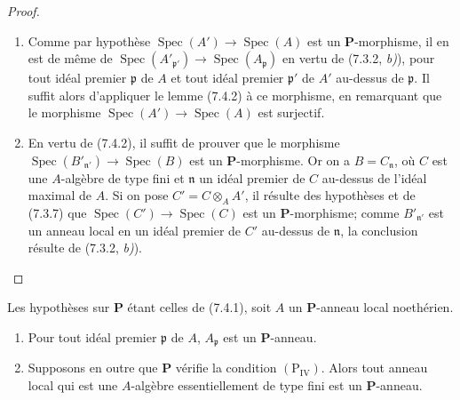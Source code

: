\begin{proof}
\begin{enumerate}
\item[(i)] Comme par hypothèse
$\operatorname{Spec}(A')\to\operatorname{Spec}(A)$ est un
$\boldsymbol P$-morphisme, il en est de même de
$\operatorname{Spec}(A'_{\mathfrak p'})\to
\operatorname{Spec}(A_{\mathfrak p})$ en vertu de (7.3.2, \emph{b)}), pour tout
idéal premier $\mathfrak p$ de $A$ et tout idéal premier $\mathfrak p'$ de
$A'$ au-dessus de $\mathfrak p$. Il suffit alors d'appliquer le lemme
(7.4.2) à ce morphisme, en remarquant que le morphisme
$\operatorname{Spec}(A')\to\operatorname{Spec}(A)$ est surjectif.
\item[(ii)] En vertu de (7.4.2), il suffit de prouver que le morphisme
$\operatorname{Spec}(B'_{\mathfrak n'})\to\operatorname{Spec}(B)$ est un
$\boldsymbol P$-morphisme. Or on a $B=C_{\mathfrak n}$, où $C$ est une
$A$-algèbre de type fini et $\mathfrak n$ un idéal premier de $C$ au-dessus
de l'idéal maximal de $A$. Si on pose $C'=C\otimes_A A'$, il résulte des
hypothèses et de (7.3.7) que
$\operatorname{Spec}(C')\to\operatorname{Spec}(C)$ est un
$\boldsymbol P$-morphisme; comme $B'_{\mathfrak n'}$ est un anneau local en
un idéal premier de $C'$ au-dessus de $\mathfrak n$, la conclusion résulte
de (7.3.2, \emph{b)}).
\end{enumerate}
\end{proof}

\begin{theorem}[7.4.4]
\label{IV.2.s7.4.4-fr}
Les hypothèses sur $\boldsymbol P$ étant celles de \textup{(7.4.1)}, soit $A$ un
$\boldsymbol P$-anneau local noethérien.
\begin{enumerate}
\item[\emph{(i)}] Pour tout idéal premier $\mathfrak p$ de $A$,
$A_{\mathfrak p}$ est un $\boldsymbol P$-anneau.
\item[\emph{(ii)}] Supposons en outre que $\boldsymbol P$ vérifie la condition
$(\mathrm P_{\mathrm{IV}})$. Alors tout anneau local qui est une
$A$-algèbre essentiellement de type fini est un $\boldsymbol P$-anneau.
\end{enumerate}
\end{theorem}

